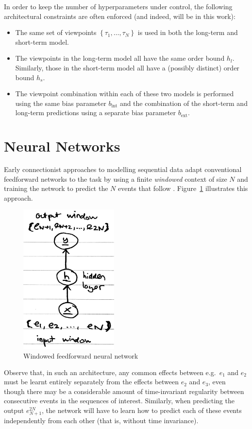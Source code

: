 \documentclass[12pt,a4paper,twoside,openright]{report}
\newcommand{\set}[1]{ \left\{ #1 \right\} }
\begin{document}
In order to keep the number of hyperparameters under control, the following
architectural constraints are often enforced (and indeed, will be in this work):
\begin{itemize}
  \item The same set of viewpoints $\set{\tau_1, \ldots, \tau_N}$ is used in both
    the long-term and short-term model. 
  \item The viewpoints in the long-term model all have the same order bound
    $h_l$. Similarly, those in the short-term model all have a (possibly
    distinct) order bound $h_s$.
  \item The viewpoint combination within each of these two models is performed
    using the same bias parameter $b_{\mathrm{int}}$ and the combination of the
    short-term and long-term predictions using a separate bias parameter
    $b_{\mathrm{ext}}$.
\end{itemize}

\section{Neural Networks}

Early connectionist approaches to modelling sequential data adapt conventional
feedforward networks to the task by using a finite \emph{windowed} context of
size $N$ and training the network to predict the $N$ events that follow
\cite{todd1989connectionist}. Figure~\ref{fig:windowed-nn} illustrates this
approach.

\begin{figure}[H]
\centering
\includegraphics[width=140pt]{figs/windowed_nn_tmp.jpg}
\caption{Windowed feedforward neural network}
\label{fig:windowed-nn}
\end{figure}

Observe that, in such an architecture, any common effects between e.g.\ $e_1$
and $e_2$ must be learnt entirely separately from the effects between $e_2$ and
$e_3$, even though there may be a considerable amount of time-invariant
regularity between consecutive events in the sequences of interest. Similarly,
when predicting the output $e_{N+1}^{2N}$, the network will have to learn how to
predict each of these events independently from each other (that is, without
time invariance).  
\end{document}
